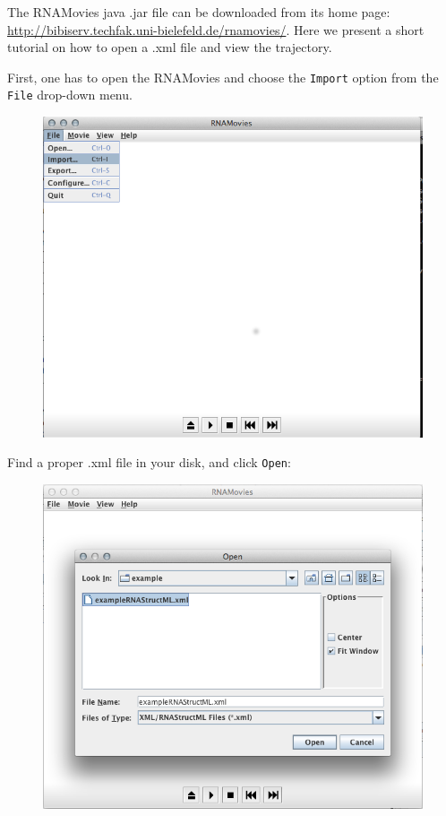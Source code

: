 \documentclass[12pt]{article}
\begin{document}
The RNAMovies \cite{Evers1999}  java .jar file can be downloaded from its home page: \url{http://bibiserv.techfak.uni-bielefeld.de/rnamovies/}. Here we present a short tutorial on how to open a .xml file and view the trajectory.

First, one has to open the RNAMovies and choose the \texttt{Import} option from the \texttt{File} drop-down menu. 
\begin{figure}[h!]
\centering
\includegraphics[scale=0.4]{./pictures/RNAmovies_1.png}
\end{figure}
\newpage
Find a proper .xml file in your disk, and click \texttt{Open}:
\begin{figure}[h!]
\centering
\includegraphics[scale=0.4]{./pictures/RNAmovies_2.png}
\end{figure}
\end{document}
